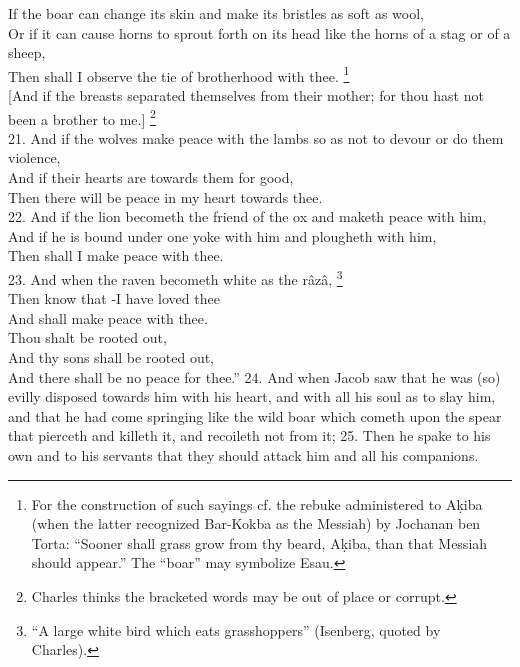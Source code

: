 If the boar can change its skin and make its bristles as soft as wool,\\
Or if it can cause horns to sprout forth on its head like the horns of a stag or of a sheep,\\
Then shall I observe the tie of brotherhood with thee. \footnote{For the construction of such sayings cf. the rebuke administered to A\d{k}iba (when the latter recognized Bar-Kokba as the Messiah) by Jochanan ben Torta: ``Sooner shall grass grow from thy beard, A\d{k}iba, than that Messiah should appear.'' The ``boar'' may symbolize Esau.}\\
{}[And if the breasts separated themselves from their mother; for thou hast not been a brother to me.] \footnote{Charles thinks the bracketed words may be out of place or corrupt.}\\
21. And if the wolves make peace with the lambs so as not to devour or do them violence,\\
And if their hearts are towards them for good,\\
Then there will be peace in my heart towards thee.\\
22. And if the lion becometh the friend of the ox and maketh peace with him, \\
And if he is bound under one yoke with him and plougheth with him,\\
Then shall I make peace with thee.\\
23. And when the raven becometh white as the râzâ, \footnote{``A large white bird which eats grasshoppers'' (Isenberg, quoted by Charles).}\\
Then know that -I have loved thee\\
And shall make peace with thee.\\
Thou shalt be rooted out,\\
And thy sons shall be rooted out,\\
And there shall be no peace for thee.'' 24. And when Jacob saw that he was (so) evilly disposed towards him with his heart, and with all his soul as to slay him, and that he had come springing like the wild boar which cometh upon the spear that pierceth and killeth it, and recoileth not from it; 25. Then he spake to his own and to his servants that they should attack him and all his companions.


